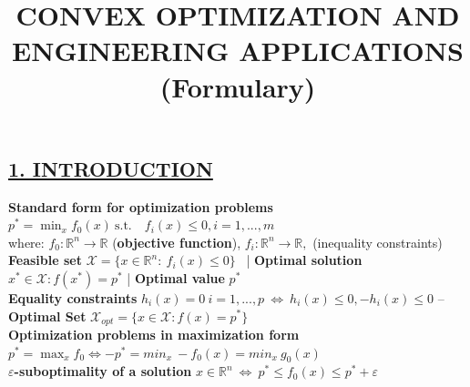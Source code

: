 \documentclass[a4paper]{article}
\title{
    \vspace{-1.5cm}
    \textbf{
        \large{
            CONVEX OPTIMIZATION AND ENGINEERING APPLICATIONS (Formulary)
   \vspace{-10ex}
        }
    }
}
\author{}
\date{}
\begin{document}
\maketitle
\thispagestyle{empty}
\vspace{0.15cm}
\subsection*{\color{cyan} \textsf{\underline{1. INTRODUCTION}}}
\textbf{Standard form for optimization problems} $p^*=\min_{x} f_0(x) \ \text{s.t.} \quad f_i(x) \le 0, i=1,..., m$\\
where: $f_0: \mathbb{R}^n \to \mathbb{R}$ (\textbf{objective function}), $f_i: \mathbb{R}^n \to \mathbb{R}, $ (inequality constraints) \\
\textbf{Feasible set} $\mathcal{X} = \{x \in \mathbb{R}^n:\ f_i(x)\le 0\}$ \ |
\textbf{Optimal solution} $x^* \in \mathcal{X}: f(x^*)=p^*$ |
\textbf{Optimal value} $p^*$\\
\textbf{Equality constraints} $h_i(x)=0 \ i=1,...,p \ \iff \ h_i(x)\le 0, -h_i(x)\le 0$  --
\textbf{Optimal Set}  $\mathcal{X}_{opt} = \{x \in \mathcal{X} : f(x)=p^*\}$ \\
\textbf{Optimization problems in maximization form} $p^*=\max_{x} f_0 \iff -p^*=min_{x} \ -f_0(x) = min_{x} \ g_0(x)$\\
\textbf{$\varepsilon$-suboptimality of a solution} $x\in \mathbb{R}^n \ \iff \ p^* \le f_0(x) \le p^*+\varepsilon$
\end{document}
